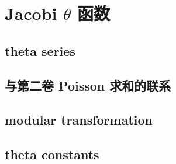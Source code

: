 \section{Jacobi \texorpdfstring{\(\theta\)}{θ} 函数}
\label{b3:sec:2401}


\subsection{theta series}
\label{b3:subsec:240101}

\subsection{与第二卷 Poisson 求和的联系}
\label{b3:subsec:240102}

\subsection{modular transformation}
\label{b3:subsec:240103}

\subsection{theta constants}
\label{b3:subsec:240104}


